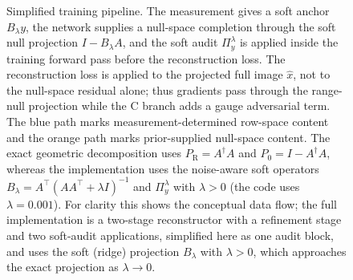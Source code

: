 \documentclass[journal]{IEEEtran}
\newcommand{\PR}{P_{\mathrm{R}}}
\newcommand{\PZ}{P_{0}}
\newcommand{\Audit}{\Pi_y^\lambda}
\newcommand{\Blambda}{B_\lambda}
\begin{document}
\begin{figure}[t]
    \caption{Simplified training pipeline.  The measurement gives a soft anchor
    $\Blambda y$, the network supplies a null-space completion through the
    soft null projection $I-\Blambda A$, and the soft audit $\Audit$ is applied
    inside the training forward pass before the reconstruction loss.  The
    reconstruction loss is applied to the projected full image $\hat{x}$, not
    to the null-space residual alone; thus gradients pass through the
    range-null projection while the C branch adds a gauge adversarial term.
    The blue path marks measurement-determined row-space content and the orange
    path marks prior-supplied null-space content.  The exact geometric
    decomposition uses $\PR=A^\dagger A$ and $\PZ=I-A^\dagger A$, whereas the
    implementation uses the noise-aware soft operators
    $\Blambda=A^\top(AA^\top+\lambda I)^{-1}$ and $\Audit$ with $\lambda>0$
    (the code uses $\lambda=0.001$).  For clarity this shows the conceptual
    data flow; the full implementation is a two-stage reconstructor with a
    refinement stage and two soft-audit applications, simplified here as one
    audit block, and uses the soft (ridge) projection $\Blambda$ with
    $\lambda>0$, which approaches the exact projection as $\lambda\to0$.}
    \label{fig:training-architecture}
\end{figure}
\end{document}
